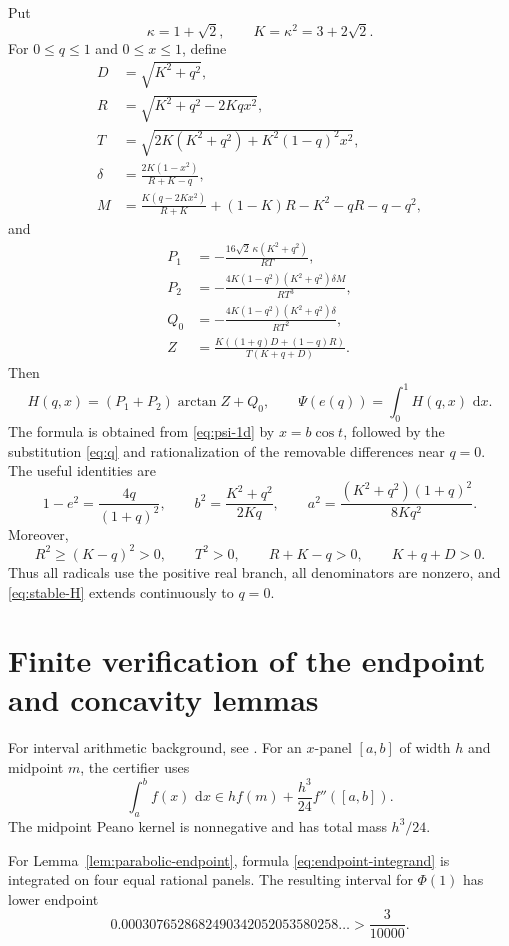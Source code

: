 \documentclass[11pt]{article}
\numberwithin{equation}{section}
\theoremstyle{remark}
\newcommand{\dd}{\,\mathrm d}
\begin{document}
Put
\[
  \kappa=1+\sqrt2,
  \qquad
  K=\kappa^2=3+2\sqrt2.
\]
For \(0\le q\le1\) and \(0\le x\le1\), define
\begin{align*}
  D&=\sqrt{K^2+q^2},\\
  R&=\sqrt{K^2+q^2-2Kqx^2},\\
  T&=\sqrt{2K(K^2+q^2)+K^2(1-q)^2x^2},\\
  \delta&=\frac{2K(1-x^2)}{R+K-q},\\
  M&=\frac{K(q-2Kx^2)}{R+K}+(1-K)R-K^2-qR-q-q^2,
\end{align*}
and
\begin{align*}
  P_1&=-\frac{16\sqrt2\,\kappa(K^2+q^2)}{RT},\\
  P_2&=-\frac{4K(1-q^2)(K^2+q^2)\delta M}{RT^3},\\
  Q_0&=-\frac{4K(1-q^2)(K^2+q^2)\delta}{RT^2},\\
  Z&=\frac{K((1+q)D+(1-q)R)}{T(K+q+D)}.
\end{align*}
Then
\begin{equation}
  H(q,x)=(P_1+P_2)\arctan Z+Q_0,
  \qquad
  \Psi(e(q))=\int_0^1H(q,x)\,\dd x.
  \label{eq:stable-H}
\end{equation}
The formula is obtained from \eqref{eq:psi-1d} by \(x=b\cos t\), followed by the substitution \eqref{eq:q} and rationalization of the removable differences near \(q=0\). The useful identities are
\[
  1-e^2=\frac{4q}{(1+q)^2},
  \qquad
  b^2=\frac{K^2+q^2}{2Kq},
  \qquad
  a^2=\frac{(K^2+q^2)(1+q)^2}{8Kq^2}.
\]
Moreover,
\[
  R^2\ge(K-q)^2>0,
  \qquad
  T^2>0,
  \qquad
  R+K-q>0,
  \qquad
  K+q+D>0.
\]
Thus all radicals use the positive real branch, all denominators are nonzero, and \eqref{eq:stable-H} extends continuously to \(q=0\).

\section{Finite verification of the endpoint and concavity lemmas}
\label{app:interval}

For interval arithmetic background, see \cite{MooreKearfottCloud2009}. For an \(x\)-panel \([a,b]\) of width \(h\) and midpoint \(m\), the certifier uses
\begin{equation}
  \int_a^bf(x)\,\dd x
  \in
  h f(m)+\frac{h^3}{24}f''([a,b]).
  \label{eq:midpoint}
\end{equation}
The midpoint Peano kernel is nonnegative and has total mass \(h^3/24\).

For Lemma~\ref{lem:parabolic-endpoint}, formula \eqref{eq:endpoint-integrand} is integrated on four equal rational panels. The resulting interval for \(\Phi(1)\) has lower endpoint
\[
0.0003076528682490342052053580258\ldots>
\frac3{10000}.
\]
\end{document}
